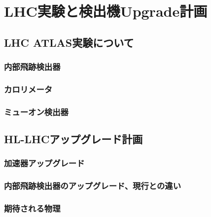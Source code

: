 \chapter{LHC実験と検出機Upgrade計画}

\section{LHC ATLAS実験について}
\subsection{内部飛跡検出器}
\subsection{カロリメータ}
\subsection{ミューオン検出器}

\section{HL-LHCアップグレード計画}
\subsection{加速器アップグレード}
\subsection{内部飛跡検出器のアップグレード、現行との違い}
\subsection{期待される物理}
